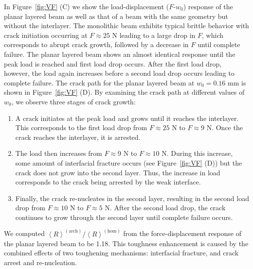 \documentclass[12pt,onecolumn]{article}
\begin{document}
\begin{bibunit}
In Figure~\ref{fig:VF} (C) we show the load-displacement ($F$-$w_0$) response of the planar layered beam as well as that of a beam with the same geometry but without the interlayer. The monolithic beam exhibits typical brittle behavior with crack initiation occurring at $F\approx25$ N leading to a large drop in $F$, which corresponds to abrupt crack growth, followed by a decrease in $F$ until complete failure. The planar layered beam shows an almost identical response until the peak load is reached and first load drop occurs. After the first load drop, however, the load again increases before a second load drop occurs leading to complete failure. The crack path for the planar layered beam at $w_0 = 0.16$ mm is shown in Figure~\ref{fig:VF} (D). By examining the crack path at different values of $w_0$, we observe three stages of crack growth:
%
\begin{enumerate}
    \item A crack initiates at the peak load and grows until it reaches the interlayer. This corresponds to the first load drop from $F \approx 25$ N to $F \approx 9$ N. Once the crack reaches the interlayer, it is arrested.
    \item The load then increases from $F \approx 9$ N to $F \approx 10$ N. During this increase, some amount of interfacial fracture occurs (see Figure~\ref{fig:VF} (D)) but the crack does not grow into the second layer. Thus, the increase in load corresponds to the crack being arrested by the weak interface.
    \item Finally, the crack re-nucleates in the second layer, resulting in the second load drop from $F \approx 10$ N to $F \approx 5$ N. After the second load drop, the crack continues to grow through the second layer until complete failure occurs.
\end{enumerate}
%
We computed $\left< R\right>^{(\mathrm{arch})}/\left< R\right>^{(\mathrm{hom})}$ from the force-displacement response of the planar layered beam to be 1.18. This toughness enhancement is caused by the combined effects of two toughening mechanisms: interfacial fracture, and crack arrest and re-nucleation.


\end{bibunit}
\end{document}
